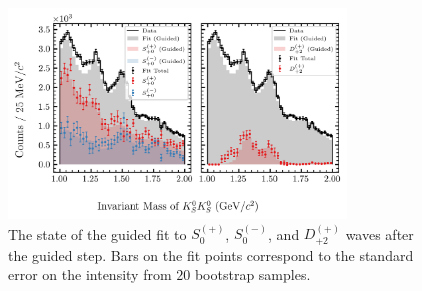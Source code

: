 \begin{figure}
  \begin{center}
    \includegraphics[width=0.8\textwidth]{figures/guided_fit_chisqdof_3.4_splot_D_1s_2b_phase_factor_waves29099_uncertainty_bootstrap-SE.png}
  \end{center}
  \caption{The state of the guided fit to $S_{0}^{(+)}$, $S_{0}^{(-)}$, and $D_{+2}^{(+)}$ waves after the guided step. Bars on the fit points correspond to the standard error on the intensity from $20$ bootstrap samples.}\label{fig:guided-fit-chisqdof-3.4-Spn-D2p}
\end{figure}

